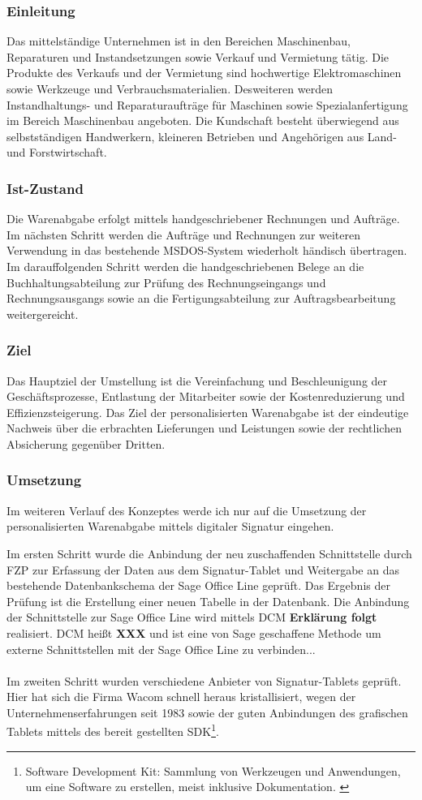 \subsubsection*{Einleitung}
Das mittelständige Unternehmen ist in den Bereichen Maschinenbau, Reparaturen und Instandsetzungen sowie Verkauf und Vermietung tätig. Die Produkte des Verkaufs und der Vermietung sind hochwertige Elektromaschinen sowie Werkzeuge und Verbrauchsmaterialien. Desweiteren werden Instandhaltungs- und Reparaturaufträge für Maschinen sowie Spezialanfertigung im Bereich Maschinenbau angeboten. Die Kundschaft besteht überwiegend aus selbstständigen Handwerkern, kleineren Betrieben und Angehörigen aus Land- und Forstwirtschaft.
\subsubsection*{Ist-Zustand}
Die Warenabgabe erfolgt mittels handgeschriebener Rechnungen und Aufträge. Im nächsten Schritt werden die Aufträge und Rechnungen zur weiteren Verwendung in das bestehende MSDOS-System wiederholt händisch übertragen. Im darauffolgenden Schritt werden die handgeschriebenen Belege an die Buchhaltungsabteilung zur Prüfung des Rechnungseingangs und Rechnungsausgangs sowie an die Fertigungsabteilung zur Auftragsbearbeitung weitergereicht.
\subsubsection*{Ziel}
Das Hauptziel der Umstellung ist die Vereinfachung und Beschleunigung der Geschäftsprozesse, Entlastung der Mitarbeiter sowie der Kostenreduzierung und Effizienzsteigerung. Das Ziel der personalisierten Warenabgabe ist der eindeutige Nachweis über die erbrachten Lieferungen und Leistungen sowie der rechtlichen Absicherung gegenüber Dritten. \cite{einleitung1}
\subsubsection*{Umsetzung}
Im weiteren Verlauf des Konzeptes werde ich nur auf die Umsetzung der personalisierten Warenabgabe mittels digitaler Signatur eingehen. 

Im ersten Schritt wurde die Anbindung der neu zuschaffenden Schnittstelle durch FZP zur Erfassung der Daten aus dem Signatur-Tablet und Weitergabe an das bestehende Datenbankschema der Sage Office Line geprüft. Das Ergebnis der Prüfung ist die Erstellung einer neuen Tabelle in der Datenbank. Die Anbindung der Schnittstelle zur Sage Office Line wird mittels DCM \textbf{Erklärung folgt} realisiert. DCM heißt \textbf{XXX} und ist eine von Sage geschaffene Methode um externe Schnittstellen mit der Sage Office Line zu verbinden...\\\\
Im zweiten Schritt wurden verschiedene Anbieter von Signatur-Tablets geprüft. Hier hat sich die Firma Wacom schnell heraus kristallisiert, wegen der Unternehmenserfahrungen seit 1983 sowie der guten Anbindungen des grafischen Tablets mittels des bereit gestellten SDK\footnote{\label{foot:4} Software Development Kit: Sammlung von Werkzeugen und Anwendungen, um eine Software zu erstellen, meist inklusive Dokumentation. \cite{SDK}}. \cite{konzept1}